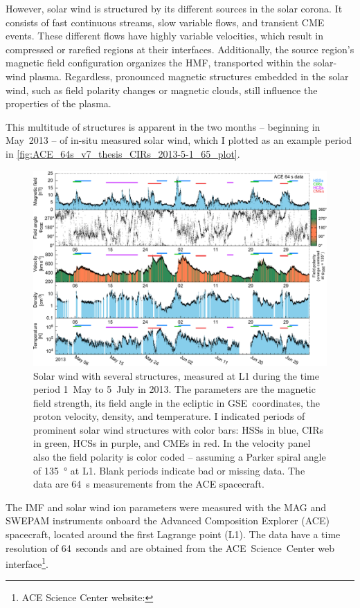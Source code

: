However, solar wind is structured by its different sources in the solar corona. It consists of fast continuous streams, slow variable flows, and transient CME events. These different flows have highly variable velocities, which result in compressed or rarefied regions at their interfaces. Additionally, the source region's magnetic field configuration organizes the HMF, transported within the solar-wind plasma. Regardless, pronounced magnetic structures embedded in the solar wind, such as field polarity changes or magnetic clouds, still influence the properties of the plasma.

This multitude of structures is apparent in the two months -- beginning in May~2013 -- of in-situ measured solar wind, which I plotted as an example period in \autoref{fig:ACE_64s_v7_thesis_CIRs_2013-5-1_65_plot}.
\begin{figure}[htb]
	\centering
	\includegraphics[width=\textwidth]{figures_of_mine/gnuplots/ACE_64s_v7_thesis_CIRs_2013-5-1_65_plot.pdf}
	\caption[]
	{Solar wind with several structures, measured at L1 during the time period 1~May to 5~July in 2013. The parameters are the magnetic field strength, its field angle in the ecliptic in GSE~coordinates, the proton velocity, density, and temperature. I indicated periods of prominent solar wind structures with color bars: HSSs in blue, CIRs in green, HCSs in purple, and CMEs in red. In the velocity panel also the field polarity is color coded -- assuming a Parker spiral angle of \SI{135}{\degree} at L1. Blank periods indicate bad or missing data. The data are 64~s measurements from the ACE spacecraft.}
	\label{fig:ACE_64s_v7_thesis_CIRs_2013-5-1_65_plot}
\end{figure}
The IMF and solar wind ion parameters were measured with the MAG and SWEPAM instruments onboard the Advanced Composition Explorer (ACE) spacecraft, located around the first Lagrange point (L1). The data have a time resolution of 64~seconds and are obtained from the ACE~Science~Center web interface\footnote{ACE Science Center website: }.

